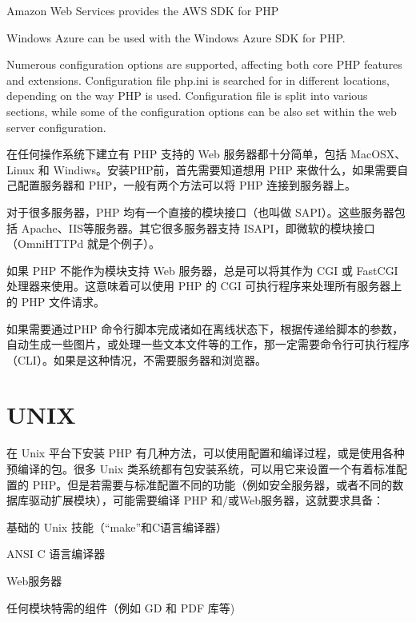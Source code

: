 \begin{compactitem}
\item Amazon Web Services provides the AWS SDK for PHP
\item Windows Azure can be used with the Windows Azure SDK for PHP.
\end{compactitem}

Numerous configuration options are supported, affecting both core PHP features and extensions. Configuration file php.ini is searched for in different locations, depending on the way PHP is used. Configuration file is split into various sections, while some of the configuration options can be also set within the web server configuration.


在任何操作系统下建立有 PHP 支持的 Web 服务器都十分简单，包括 MacOSX、Linux 和 Windiws。安装PHP前，首先需要知道想用 PHP 来做什么，如果需要自己配置服务器和 PHP，一般有两个方法可以将 PHP 连接到服务器上。

对于很多服务器，PHP 均有一个直接的模块接口（也叫做 SAPI）。这些服务器包括 Apache、IIS等服务器。其它很多服务器支持 ISAPI，即微软的模块接口（OmniHTTPd 就是个例子）。

如果 PHP 不能作为模块支持 Web 服务器，总是可以将其作为 CGI 或 FastCGI 处理器来使用。这意味着可以使用 PHP 的 CGI 可执行程序来处理所有服务器上的 PHP 文件请求。

如果需要通过PHP 命令行脚本完成诸如在离线状态下，根据传递给脚本的参数，自动生成一些图片，或处理一些文本文件等的工作，那一定需要命令行可执行程序（CLI）。如果是这种情况，不需要服务器和浏览器。


\section{UNIX}

在 Unix 平台下安装 PHP 有几种方法，可以使用配置和编译过程，或是使用各种预编译的包。很多 Unix 类系统都有包安装系统，可以用它来设置一个有着标准配置的 PHP。但是若需要与标准配置不同的功能（例如安全服务器，或者不同的数据库驱动扩展模块），可能需要编译 PHP 和/或Web服务器，这就要求具备：

\begin{compactitem}
\item 基础的 Unix 技能（“make”和C语言编译器）
\item ANSI C 语言编译器
\item Web服务器
\item 任何模块特需的组件（例如 GD 和 PDF 库等)
\end{compactitem}

